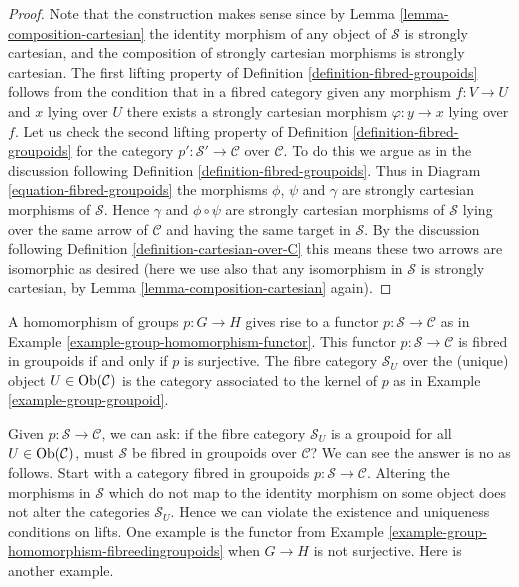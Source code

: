 \begin{proof}
Note that the construction makes sense since by
Lemma \ref{lemma-composition-cartesian}
the identity morphism of any object of $\mathcal{S}$ is strongly cartesian,
and the composition of strongly cartesian morphisms is strongly cartesian.
The first lifting property of
Definition \ref{definition-fibred-groupoids}
follows from the condition that in a fibred category
given any morphism $f : V \to U$ and $x$ lying over $U$ there exists
a strongly cartesian morphism $\varphi : y \to x$ lying over $f$.
Let us check the second lifting property of
Definition \ref{definition-fibred-groupoids}
for the category $p' : \mathcal{S}' \to \mathcal{C}$ over $\mathcal{C}$.
To do this we argue as in the discussion following
Definition \ref{definition-fibred-groupoids}.
Thus in Diagram \ref{equation-fibred-groupoids} the
morphisms $\phi$, $\psi$ and $\gamma$ are strongly cartesian morphisms
of $\mathcal{S}$.
Hence $\gamma$ and $\phi \circ \psi$ are strongly cartesian morphisms
of $\mathcal{S}$ lying over the same arrow of $\mathcal{C}$ and
having the same target in $\mathcal{S}$. By the discussion following
Definition \ref{definition-cartesian-over-C}
this means these two arrows are isomorphic as desired (here we use also
that any isomorphism in $\mathcal{S}$ is strongly cartesian, by
Lemma \ref{lemma-composition-cartesian} again).
\end{proof}

\begin{example}
\label{example-group-homomorphism-fibreedingroupoids}
A homomorphism of groups $p : G \to H$ gives rise to a functor
$p : \mathcal{S}\to\mathcal{C}$ as in Example
\ref{example-group-homomorphism-functor}. This functor
$p : \mathcal{S}\to\mathcal{C}$ is fibred in groupoids if and only if
$p$ is surjective. The fibre category $\mathcal{S}_U$ over the (unique)
object $U\in \mathop{\mathrm{Ob}}\nolimits(\mathcal{C})$ is the category associated to the
kernel of $p$ as in Example \ref{example-group-groupoid}.
\end{example}

\noindent
Given $p : \mathcal{S} \to \mathcal{C}$, we can ask: if the fibre
category $\mathcal{S}_U$ is a groupoid for all $U \in \mathop{\mathrm{Ob}}\nolimits(\mathcal{C})$,
must $\mathcal{S}$ be fibred in groupoids over $\mathcal{C}$? We can see the
answer is no as follows. Start with a category fibred in groupoids
$p : \mathcal{S} \to \mathcal{C}$. Altering the morphisms in $\mathcal{S}$
which do not map to the identity morphism on some object does not alter the
categories $\mathcal{S}_U$. Hence we can violate the existence and uniqueness
conditions on lifts. One example is the functor from Example
\ref{example-group-homomorphism-fibreedingroupoids} when $G \to H$ is not
surjective. Here is another example.

